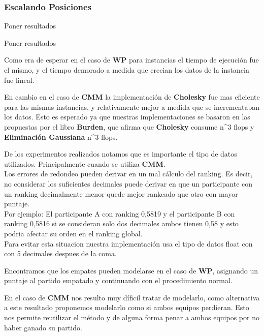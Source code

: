 \subsubsection{Escalando Posiciones}


Poner resultados



Poner resultados




Como era de esperar en el caso de \textbf{WP} para instancias el tiempo de ejecución fue el mismo, y el tiempo demorado a medida que crecian los datos de la instancia fue lineal.

En cambio en el caso de \textbf{CMM} la implementación de \textbf{Cholesky} fue mas eficiente para las mismas instancias, y relativamente mejor a medida que se incrementaban los datos. 
Esto es esperado ya que nuestras implementaciones se basaron en las propuestas por el libro \textbf{Burden}, que afirma que \textbf{Cholesky} consume  n^3 flops y 
\textbf{Eliminación Gaussiana}  n^3 flops.



De los experimentos realizados notamos que es importante el tipo de datos utilizados. Principalmente cuando se utiliza \textbf{CMM}.
\\

Los errores de redondeo pueden derivar en un mal cálculo del ranking. Es decir, no considerar los suficientes decimales puede derivar en que un participante con un ranking
decimalmente menor quede mejor rankeado que otro con mayor puntaje.\\

Por ejemplo: El participante A con ranking 0,5819 y el participante B con ranking 0,5816 si se consideran solo dos decimales ambos tienen 0,58 y esto podria afectar su orden 
en el ranking global. \\

Para evitar esta situacion nuestra implementación usa el tipo de datos float con con 5 decimales despues de la coma.\\



Encontramos que los empates pueden modelarse en el caso de \textbf{WP}, asignando un puntaje al partido empatado y continuando con el procedimiento normal.

En el caso de \textbf{CMM} nos resulto muy díficil tratar de modelarlo, como alternativa a este resultado proponemos modelarlo como si ambos equipos perdieran. Esto nos permite 
reutilizar el método y de alguna forma penar a ambos equipos por no haber ganado su partido.
















